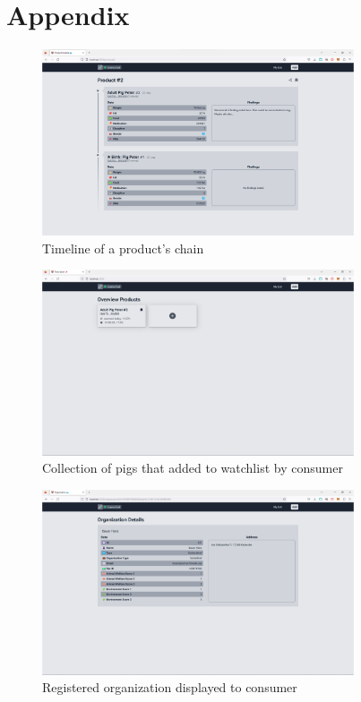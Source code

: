 \section{Appendix}
\begin{figure}[tbh]
    \centering
    \includegraphics[width=0.82\textwidth]{images/timeline.png}
    \caption{Timeline of a product's chain}
    \label{fig:timeline_pig}
\end{figure}

\begin{figure}[tbh]
    \centering
    \includegraphics[width=0.82\textwidth]{images/list_pigs.png}
    \caption{Collection of pigs that added to watchlist by consumer}
    \label{fig:list_of_pigs}
\end{figure}


\begin{figure}[tbh]
    \centering
    \includegraphics[width=0.82\textwidth]{images/oragnization.png}
    \caption{Registered organization displayed to consumer}
    \label{fig:organization}
\end{figure}

